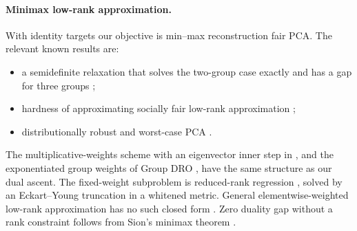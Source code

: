 \paragraph{Minimax low-rank approximation.} With identity targets our objective is min--max
reconstruction fair PCA. The relevant known results are:
\begin{itemize}
\item a semidefinite relaxation that solves the two-group case exactly and has a gap for three
groups \citep{samadi2018fairpca,tantipongpipat2019multicriteria};
\item hardness of approximating socially fair low-rank approximation \citep{song2024socially};
\item distributionally robust and worst-case PCA \citep{wang2025stablepca,fries2026worstcase}.
\end{itemize}
The multiplicative-weights scheme with an eigenvector inner step in \citet{samadi2018fairpca}, and
the exponentiated group weights of Group DRO \citep{sagawa2019groupdro}, have the same structure
as our dual ascent. The fixed-weight subproblem is reduced-rank regression
\citep{izenman1975reduced}, solved by an Eckart--Young truncation \citep{eckart1936approximation}
in a whitened metric. General elementwise-weighted low-rank approximation has no such closed form
\citep{srebro2003weighted}. Zero duality gap without a rank constraint follows from Sion's minimax
theorem \citep{sion1958minimax}.
